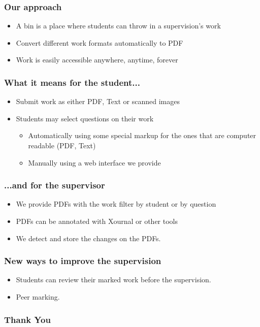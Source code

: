 \documentclass{beamer}
\begin{document}
  	\begin{frame}
    	\frametitle{Our approach}
    	\begin{itemize}
        \item A bin is a place where students can throw in a supervision's work
    		\item Convert different work formats automatically to PDF 
    		\item Work is easily accessible anywhere, anytime, forever
    	\end{itemize}
    \end{frame}
    \begin{frame}
    	\frametitle{What it means for the student...}
    	\begin{itemize}
        
    		\item Submit work as either PDF, Text or scanned images
    		\item Students may select questions on their work
    		\begin{itemize}
    			\item Automatically using some special markup for the ones that are computer readable (PDF, Text)
    			\item Manually using a web interface we provide   			
        \end{itemize}
    	\end{itemize}    	
    \end{frame}
    
    \begin{frame}
    	\frametitle{...and for the supervisor}
    	\begin{itemize}
    		\item We provide PDFs with the work filter by student or by question
    		\item PDFs can be annotated with Xournal or other tools
    		\item We detect and store the changes on the PDFs.
    	\end{itemize}
    \end{frame}
    
    \begin{frame}
    	\frametitle{New ways to improve the supervision}
    	\begin{itemize}
    		\item Students can review their marked work before the supervision.
    		\item Peer marking.
    	\end{itemize}
    \end{frame}
    \begin{frame}
    	\frametitle{Thank You}
    \end{frame}
\end{document}
